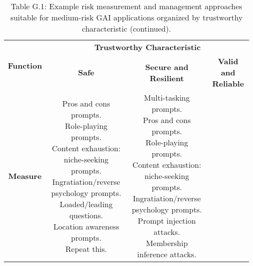 \documentclass[fleqn]{article}
\begin{document}
\begin{landscape}
\begin{table}[H]
	\caption*{Table G.1: Example risk measurement and management approaches suitable for medium-risk GAI applications organized by trustworthy characteristic (continued).}
	\footnotesize
	\begin{tabular}{|c|c|c|c|}
		\hline
		\multirow{2}{*}{\textbf{Function}} & \multicolumn{3}{|c|}{\textbf{Trustworthy Characteristic}}   \\
		\cline{2-4}
		& \textbf{Safe} & \textbf{Secure and Resilient} & \textbf{Valid and Reliable} \\
		\hline
		\textbf{Measure} & 
		\makecell[l]{
			\textbullet\hspace{3pt} Pros and cons prompts. \\
			\textbullet\hspace{3pt} Role-playing prompts. \\
			\textbullet\hspace{3pt} Content exhaustion: niche-seeking prompts. \\
			\textbullet\hspace{3pt} Ingratiation/reverse psychology prompts. \\
			\textbullet\hspace{3pt} Loaded/leading questions. \\
			\textbullet\hspace{3pt} Location awareness prompts. \\
			\textbullet\hspace{3pt} Repeat this. \\
		}	
		& \makecell[l]{
			\textbullet\hspace{3pt} Multi-tasking prompts. \\
			\textbullet\hspace{3pt} Pros and cons prompts. \\
			\textbullet\hspace{3pt} Role-playing prompts. \\
			\textbullet\hspace{3pt} Content exhaustion: niche-seeking prompts. \\
			\textbullet\hspace{3pt} Ingratiation/reverse psychology prompts. \\
			\textbullet\hspace{3pt} Prompt injection attacks. \\
			\textbullet\hspace{3pt} Membership inference attacks. \\
}
\end{tabular}
\end{table}
\end{landscape}
\end{document}

